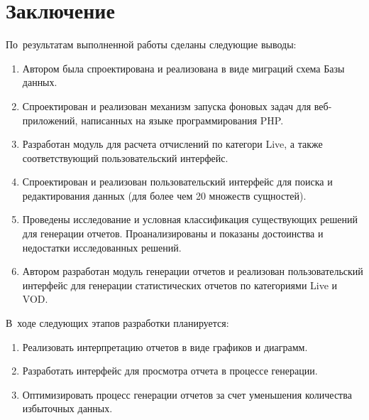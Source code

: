 \section*{Заключение}

По~результатам выполненной работы сделаны следующие выводы:

\begin{enumerate}
\item {
Автором была спроектирована и реализована в виде миграций схема
Базы данных.
}
\item {
Спроектирован и реализован механизм запуска фоновых задач для веб-приложений, написанных
на языке программирования PHP.
}
\item {
Разработан модуль для расчета отчислений по категори Live, а также соответствующий
пользовательский интерфейс. 
}
\item {
Спроектирован и реализован пользовательский интерфейс для поиска
и редактирования данных (для более чем 20 множеств сущностей).
}
\item {
Проведены исследование и условная классификация существующих 
решений для генерации отчетов. 
Проанализированы и показаны достоинства и недостатки исследованных решений.
}
\item {
Автором разработан модуль генерации отчетов и реализован
пользовательский интерфейс для генерации статистических отчетов
по категориями Live и VOD.
}
\end{enumerate}

В~ходе следующих этапов разработки планируется:
\begin{enumerate}
\item {
Реализовать интерпретацию отчетов в виде графиков и диаграмм.
}
\item {
Разработать интерфейс для просмотра отчета в процессе генерации.
}
\item {
Оптимизировать процесс генерации отчетов за счет уменьшения количества избыточных данных.
}
\end{enumerate}
